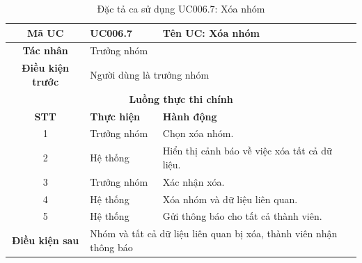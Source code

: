 \begin{table}[H]
    \centering
    \label{tab:uc006-7}
    \begin{tabularx}{\textwidth}{|c|p{3.5cm}|X|}
        \hline
        \rowcolor{headergreen} 
        \textbf{Mã UC} & \textbf{UC006.7} & \textbf{Tên UC: Xóa nhóm} \\ \hline
        \textbf{Tác nhân} & \multicolumn{2}{l|}{Trưởng nhóm} \\ \hline
        \textbf{Điều kiện trước} & \multicolumn{2}{X|}{Người dùng là trưởng nhóm} \\ \hline
        
        \multicolumn{3}{|c|}{\cellcolor{headerorange}\textbf{Luồng thực thi chính}} \\ \hline
        \rowcolor{graybg} \textbf{STT} & \textbf{Thực hiện} & \textbf{Hành động} \\ \hline
        1 & Trưởng nhóm & Chọn xóa nhóm. \\ \hline
        2 & Hệ thống & Hiển thị cảnh báo về việc xóa tất cả dữ liệu. \\ \hline
        3 & Trưởng nhóm & Xác nhận xóa. \\ \hline
        4 & Hệ thống & Xóa nhóm và dữ liệu liên quan. \\ \hline
        5 & Hệ thống & Gửi thông báo cho tất cả thành viên. \\ \hline
        
        \textbf{Điều kiện sau} & \multicolumn{2}{X|}{Nhóm và tất cả dữ liệu liên quan bị xóa, thành viên nhận thông báo} \\ \hline
    \end{tabularx}
    \caption{Đặc tả ca sử dụng UC006.7: Xóa nhóm}
\end{table}

